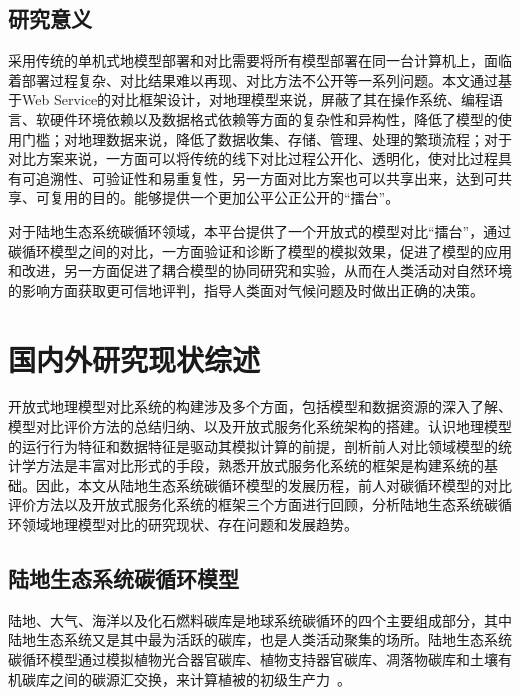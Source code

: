 \subsection{研究意义}
采用传统的单机式地模型部署和对比需要将所有模型部署在同一台计算机上，面临着部署过程复杂、对比结果难以再现、对比方法不公开等一系列问题。本文通过基于Web Service的对比框架设计，对地理模型来说，屏蔽了其在操作系统、编程语言、软硬件环境依赖以及数据格式依赖等方面的复杂性和异构性，降低了模型的使用门槛；对地理数据来说，降低了数据收集、存储、管理、处理的繁琐流程；对于对比方案来说，一方面可以将传统的线下对比过程公开化、透明化，使对比过程具有可追溯性、可验证性和易重复性，另一方面对比方案也可以共享出来，达到可共享、可复用的目的。能够提供一个更加公平公正公开的“擂台”。

对于陆地生态系统碳循环领域，本平台提供了一个开放式的模型对比“擂台”，通过碳循环模型之间的对比，一方面验证和诊断了模型的模拟效果，促进了模型的应用和改进，另一方面促进了耦合模型的协同研究和实验，从而在人类活动对自然环境的影响方面获取更可信地评判，指导人类面对气候问题及时做出正确的决策。

\section{国内外研究现状综述}

开放式地理模型对比系统的构建涉及多个方面，包括模型和数据资源的深入了解、模型对比评价方法的总结归纳、以及开放式服务化系统架构的搭建。认识地理模型的运行行为特征和数据特征是驱动其模拟计算的前提，剖析前人对比领域模型的统计学方法是丰富对比形式的手段，熟悉开放式服务化系统的框架是构建系统的基础。因此，本文从陆地生态系统碳循环模型的发展历程，前人对碳循环模型的对比评价方法以及开放式服务化系统的框架三个方面进行回顾，分析陆地生态系统碳循环领域地理模型对比的研究现状、存在问题和发展趋势。

\subsection{陆地生态系统碳循环模型}

陆地、大气、海洋以及化石燃料碳库是地球系统碳循环的四个主要组成部分，其中陆地生态系统又是其中最为活跃的碳库，也是人类活动聚集的场所。陆地生态系统碳循环模型通过模拟植物光合器官碳库、植物支持器官碳库、凋落物碳库和土壤有机碳库之间的碳源汇交换，来计算植被的初级生产力~\cite{毛留喜2006陆地生态系统碳循环模型研究概述}。

